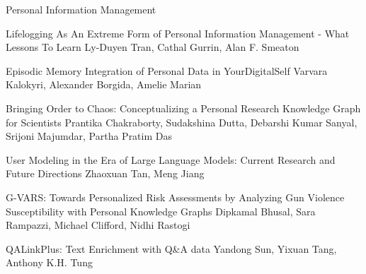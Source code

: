 \documentclass[11pt]{article}
\begin{document}
\begin{bulletin}
\begin{articlesection}{Personal Information Management}
%
%
\begin{article}
{Lifelogging As An Extreme Form of Personal Information Management - What Lessons To Learn}
{Ly-Duyen Tran, Cathal Gurrin, Alan F. Smeaton}
\setcounter{section}{0}

\end{article}
\begin{article}
{Episodic Memory Integration of Personal Data in YourDigitalSelf}
{Varvara Kalokyri, Alexander Borgida, Amelie Marian}
\setcounter{section}{0}

\end{article}
\begin{article}
{Bringing Order to Chaos: Conceptualizing a Personal Research Knowledge Graph for Scientists}
{Prantika Chakraborty, Sudakshina Dutta, Debarshi Kumar Sanyal, Srijoni Majumdar, Partha Pratim Das}
\setcounter{section}{0}

\end{article}
\begin{article}
{User Modeling in the Era of Large Language Models: Current Research and Future Directions}
{Zhaoxuan Tan, Meng Jiang}
\setcounter{section}{0}

\end{article}
\begin{article}
{G-VARS: Towards Personalized Risk Assessments by Analyzing Gun Violence Susceptibility with Personal Knowledge Graphs}
{Dipkamal Bhusal, Sara Rampazzi, Michael Clifford, Nidhi Rastogi}
\setcounter{section}{0}

\end{article}
\begin{article}
{QALinkPlus: Text Enrichment with Q&A data}
{Yandong Sun, Yixuan Tang, Anthony K.H. Tung}
\setcounter{section}{0}

\end{article}
\end{articlesection}




\end{bulletin}
\end{document}

